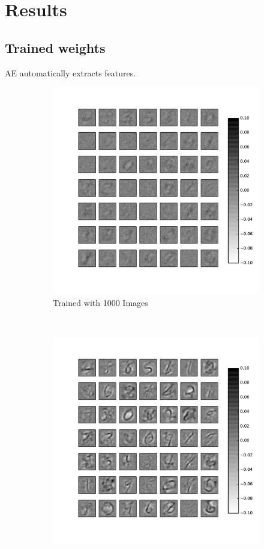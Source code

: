 	\section{Results}
	\subsection{Trained weights}
	AE automatically extracts features.
	\begin{figure}
		\centering
		\begin{subfigure}[t]{0.9\textwidth}
			\includegraphics[width=\textwidth]{pics_ae/weights_e0_1000.pdf}
			\caption{Trained with 1000 Images}
		\end{subfigure}\\
		\begin{subfigure}[t]{0.9\textwidth}
			\includegraphics[width=\textwidth]{pics_ae/weights_e0_60000.pdf}

\end{subfigure}
\end{figure}
